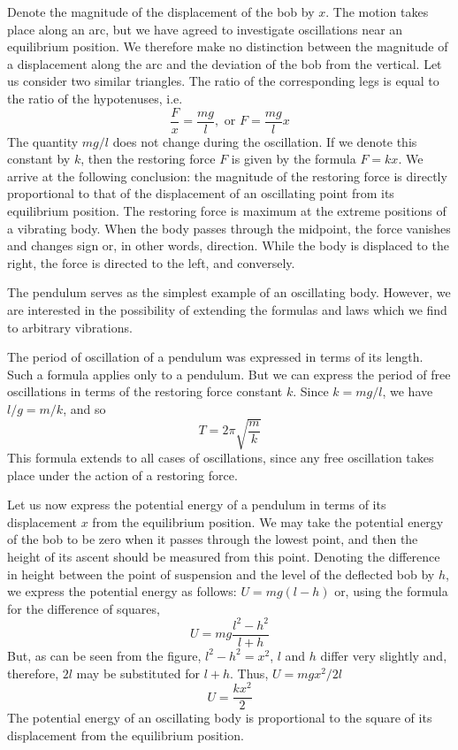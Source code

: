 Denote the magnitude of the displacement of the bob
by $x$. The motion takes place along an arc, but we have
agreed to investigate oscillations near an equilibrium
position. We therefore make no distinction between the
magnitude of a displacement along the arc and the deviation of the bob from the vertical. Let us consider two similar triangles. The ratio of the corresponding legs is equal to the ratio of the hypotenuses, i.e.
\begin{equation*}%
\frac{F}{x} = \frac{mg}{l}, \,\,\textrm{or}\,\,F = \frac{mg}{l}x
\end{equation*}
The quantity $mg/l$ does not change during the oscillation. If we denote this constant by $k$, then the restoring force $F$ is given by the formula $F = kx$. We arrive at the following conclusion: the magnitude of the restoring force is directly proportional to that of the displacement of an oscillating point from its equilibrium position. The restoring force is maximum at the extreme positions
of a vibrating body. When the body passes through the
midpoint, the force vanishes and changes sign or, in
other words, direction. While the body is displaced to
the right, the force is directed to the left, and conversely.

The pendulum serves as the simplest example of an
oscillating body. However, we are interested in the possibility of extending the formulas and laws which we
find to arbitrary vibrations.

The period of oscillation of a pendulum was expressed
in terms of its length. Such a formula applies only to
a pendulum. But we can express the period of free oscillations in terms of the restoring force constant $k$. Since $k = mg/l$, we have
$l/g= m/k$, and so 
\begin{equation*}%
T = 2 \pi \sqrt{\frac{m}{k}}
\end{equation*}
\label{pend-osc}
This formula extends to all cases of oscillations, since
any free oscillation takes place under the action of a restoring force.

Let us now express the potential energy of a pendulum
in terms of its displacement $x$ from the equilibrium position. We may take the potential energy of the bob to be zero when it passes through the lowest point, and then the height of its ascent should be measured from this point. Denoting the difference in height between the point of suspension and the level of the deflected bob by $h$, we express the potential energy as follows: $U = mg (l - h)$ or, using the formula for the difference of squares,
\begin{equation*}%
U = mg \frac{l^{2}-h^{2}}{l+h}
\end{equation*}
But, as can be seen from the figure, $l^{2} -h^{2} = x^{2}$, $l$ and
$h$ differ very slightly and, therefore, $2l$ may be substituted for $l
+ h$. Thus, $U = mgx^{2}/2l$
\begin{equation*}%
U = \frac{kx^{2}}{2}
\end{equation*}
The potential energy of an oscillating body is proportional to the square of its displacement from the equilibrium position.


